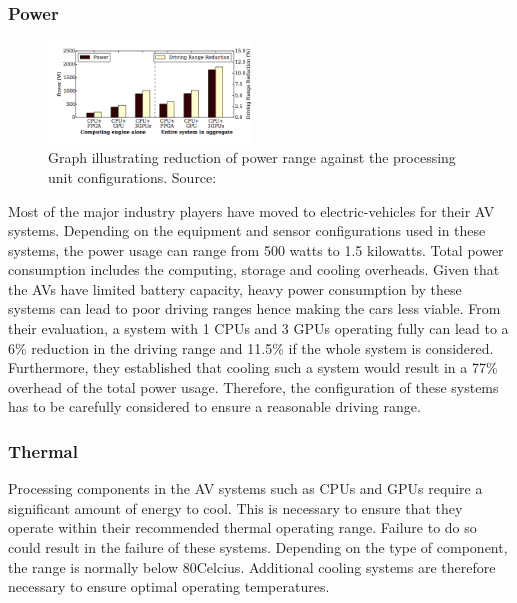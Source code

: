 \subsubsection{Power} 
\begin{figure}
	\centering
	\includegraphics[width=0.48\textwidth]{images/power_reduction}
	\caption{Graph illustrating reduction of power range against the processing unit configurations. Source:\cite{lin2018architectural}}
	\label{fig:powerred}
\end{figure}
Most of the major industry players have moved to electric-vehicles for their AV systems. Depending on the equipment and sensor configurations used in these systems, the power usage can range from 500 watts to 1.5 kilowatts. Total power consumption includes the computing, storage and cooling overheads. Given that the AVs have limited battery capacity, heavy power consumption by these systems can lead to poor driving ranges hence making the cars less viable.
From their evaluation, a system with 1 CPUs and 3 GPUs operating fully can lead to a 6\% reduction in the driving range and 11.5\% if the whole system is considered. Furthermore, they established that cooling such a system would result in a 77\% overhead of the total power usage.
Therefore,  the configuration of these systems has to be carefully considered to ensure a reasonable driving range. 

\subsubsection*{Thermal} 
Processing components in the AV systems such as CPUs and GPUs require a significant amount of energy to cool. This is necessary to ensure that they operate within their recommended thermal operating range. Failure to do so could result in the failure of these systems.  Depending on the type of component, the range is normally below 80\degree Celcius. Additional cooling systems are therefore necessary to ensure optimal operating temperatures. 

